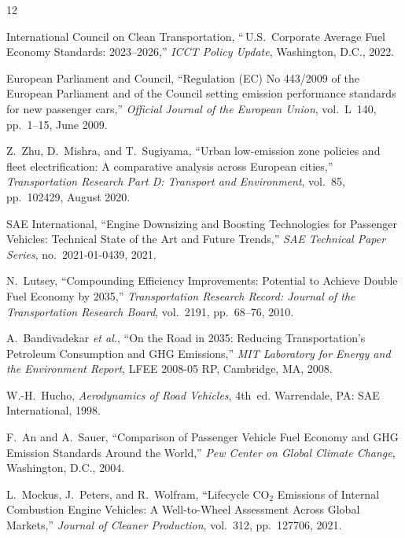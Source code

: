 \documentclass[conference]{IEEEtran}
\begin{document}


\begin{thebibliography}{12}

International Council on Clean Transportation,
``\,U.S.\ Corporate Average Fuel Economy Standards: 2023--2026,''
\textit{ICCT Policy Update}, Washington, D.C., 2022.

European Parliament and Council,
``Regulation (EC) No 443/2009 of the European Parliament and of the
Council setting emission performance standards for new passenger cars,''
\textit{Official Journal of the European Union}, vol.~L~140,
pp.~1--15, June 2009.

Z.~Zhu, D.~Mishra, and T.~Sugiyama,
``Urban low-emission zone policies and fleet electrification:
A comparative analysis across European cities,''
\textit{Transportation Research Part D: Transport and Environment},
vol.~85, pp.~102429, August 2020.

SAE International,
``Engine Downsizing and Boosting Technologies for Passenger Vehicles:
Technical State of the Art and Future Trends,''
\textit{SAE Technical Paper Series}, no.~2021-01-0439, 2021.

N.~Lutsey,
``Compounding Efficiency Improvements: Potential to Achieve Double
Fuel Economy by 2035,''
\textit{Transportation Research Record: Journal of the Transportation
Research Board}, vol.~2191, pp.~68--76, 2010.

A.~Bandivadekar \textit{et al.},
``On the Road in 2035: Reducing Transportation's Petroleum Consumption
and GHG Emissions,''
\textit{MIT Laboratory for Energy and the Environment Report},
LFEE 2008-05 RP, Cambridge, MA, 2008.

W.-H.~Hucho,
\textit{Aerodynamics of Road Vehicles}, 4th~ed.
Warrendale, PA: SAE International, 1998.

F.~An and A.~Sauer,
``Comparison of Passenger Vehicle Fuel Economy and GHG Emission
Standards Around the World,''
\textit{Pew Center on Global Climate Change}, Washington, D.C., 2004.

L.~Mockus, J.~Peters, and R.~Wolfram,
``Lifecycle CO$_2$ Emissions of Internal Combustion Engine Vehicles:
A Well-to-Wheel Assessment Across Global Markets,''
\textit{Journal of Cleaner Production}, vol.~312, pp.~127706, 2021.


\end{thebibliography}
\end{document}
